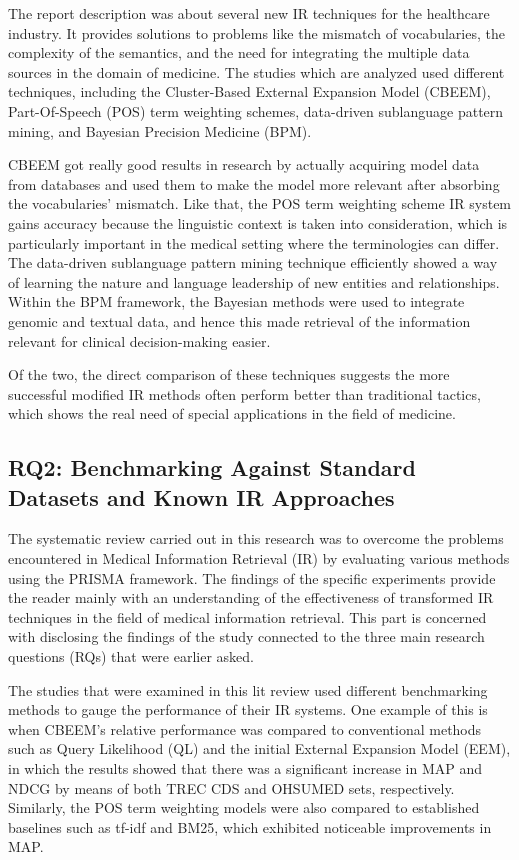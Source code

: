 \documentclass[conference]{IEEEtran}
\begin{document}
The report description was about several new IR techniques for the healthcare industry. It provides solutions to problems like the mismatch of vocabularies, the complexity of the semantics, and the need for integrating the multiple data sources in the domain of medicine. The studies which are analyzed used different techniques, including the Cluster-Based External Expansion Model (CBEEM), Part-Of-Speech (POS) term weighting schemes, data-driven sublanguage pattern mining, and Bayesian Precision Medicine (BPM).

CBEEM got really good results in research by actually acquiring model data from databases and used them to make the model more relevant after absorbing the vocabularies' mismatch. Like that, the POS term weighting scheme IR system gains accuracy because the linguistic context is taken into consideration, which is particularly important in the medical setting where the terminologies can differ. The data-driven sublanguage pattern mining technique efficiently showed a way of learning the nature and language leadership of new entities and relationships. Within the BPM framework, the Bayesian methods were used to integrate genomic and textual data, and hence this made retrieval of the information relevant for clinical decision-making easier.

Of the two, the direct comparison of these techniques suggests the more successful modified IR methods often perform better than traditional tactics, which shows the real need of special applications in the field of medicine.

\subsection{RQ2: Benchmarking Against Standard Datasets and Known IR Approaches}

The systematic review carried out in this research was to overcome the problems encountered in Medical Information Retrieval (IR) by evaluating various methods using the PRISMA framework. The findings of the specific experiments provide the reader mainly with an understanding of the effectiveness of transformed IR techniques in the field of medical information retrieval. This part is concerned with disclosing the findings of the study connected to the three main research questions (RQs) that were earlier asked.

The studies that were examined in this lit review used different benchmarking methods to gauge the performance of their IR systems. One example of this is when CBEEM's relative performance was compared to conventional methods such as Query Likelihood (QL) and the initial External Expansion Model (EEM), in which the results showed that there was a significant increase in MAP and NDCG by means of both TREC CDS and OHSUMED sets, respectively. Similarly, the POS term weighting models were also compared to established baselines such as tf-idf and BM25, which exhibited noticeable improvements in MAP.
\end{document}
